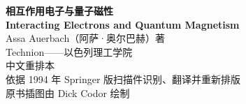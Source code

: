 \documentclass[11pt,a4paper,twoside,openright]{ctexbook}
\begin{document}
\frontmatter
\begin{titlepage}
\centering
{\Huge\bfseries 相互作用电子与量子磁性\\[0.8em]}
{\LARGE\bfseries Interacting Electrons and Quantum Magnetism\\[3em]}
{\Large Assa Auerbach（阿萨·奥尔巴赫）\quad 著\\[1em]}
{\large Technion——以色列理工学院\\[6em]}
{\large 中文重排本\\[0.5em]}
{\large 依据 1994 年 Springer 版扫描件识别、翻译并重新排版\\[0.5em]}
{\large 原书插图由 Dick Codor 绘制\\[4em]}
\end{titlepage}
\thispagestyle{empty}\mbox{}\clearpage
\tableofcontents
\mainmatter





























\appendix
{}







\end{document}

